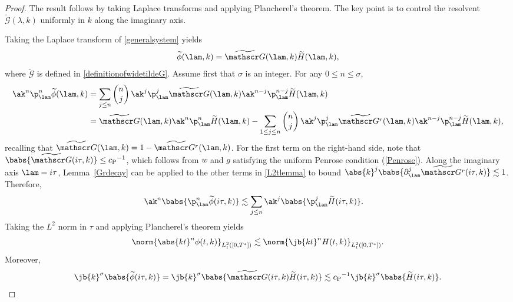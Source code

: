 \begin{proof}The result follows by taking Laplace transforms and applying Plancherel's theorem. The key point is to control the resolvent \(\widetilde{\mathscr G}(\lambda, k)\) uniformly in \(k\) along the imaginary axis.

Taking the Laplace transform of \eqref{generalsystem} yields\begin{align}\label{marnie}
\widetilde\phi(\lam,k)=\widetilde {\mathscr G}(\lam,k)\widetilde H(\lam,k),
\end{align}where $\widetilde{\mathscr G}$ is defined in \eqref{definitionofwidetildeG}. Assume first that $\sigma$ is an integer. For any $0\leq n\leq \sigma$,
\begin{align}\nonumber
\ak^n\p_\lam^n\widetilde\phi(\lam,k)&=\sum_{j\leq n}\begin{pmatrix}
n\\j
\end{pmatrix}\ak^j\p_\lam^j\widetilde {\mathscr G}(\lam,k)\ak^{n-j}\p_{\lam}^{n-j}\widetilde H(\lam,k)\\
&=\widetilde {\mathscr G}(\lam,k)\ak^n\p_\lam^n \widetilde H(\lam,k)-\sum_{1\leq j\leq n}\begin{pmatrix}
n\\j
\end{pmatrix}\ak^j\p_\lam^j\widetilde {\mathscr G^r}(\lam,k)\ak^{n-j}\p_{\lam}^{n-j}\widetilde H(\lam,k), \label{L2tlemma} \end{align} recalling that $\widetilde {\mathscr G}(\lam,k)=1-\widetilde {\mathscr G^r}(\lam,k)$.
For the first term on the right-hand side, note that $\babs{\widetilde {\mathscr G}(i\tau,k)}\leq {c_{\mathrm{P}}}^{-1}$, which follows from $w$ and $g$ satisfying the uniform Penrose condition (\ref{Penrose}). Along the imaginary axis $\lam=i\tau$, Lemma~\ref{Grdecay} can be applied to the other terms in \eqref{L2tlemma} to bound $\abs{k}^j\babs{\partial^j_\lam \widetilde{\mathscr G^r}(i\tau,k)}\lesssim1$. Therefore,
\begin{align*}
\ak^n\babs{\p_\lam^n\widetilde\phi(i\tau,k)}&\lesssim\sum_{j\leq n} \ak^{j}\babs{\p_\lam^{j}\widetilde H(i\tau,k)}.
\end{align*}
Taking the $L^2$ norm in $\tau$ and applying Plancherel's theorem yields
\begin{align*}
\norm{\abs{kt}^n\phi(t,k)}_{L^2_t([0,T^*])}\lesssim\norm{\jb{kt}^nH(t,k)}_{L^2_t([0,T^*])}.
\end{align*}Moreover,
\begin{align*}
\jb{k}^\sigma\babs{\widetilde\phi(i\tau,k)}=\jb{k}^\sigma\babs{\widetilde {\mathscr G}(i\tau,k)\widetilde H(i\tau,k)}\lesssim{c_{\mathrm{P}}}^{-1}\jb{k}^\sigma\babs{\widetilde H(i\tau,k)}.

\end{align*}
\end{proof}
